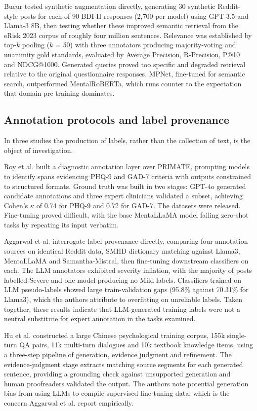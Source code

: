 \documentclass[11pt]{article}
\begin{document}
	Bucur\cite{bucur2024leveraging} tested synthetic augmentation directly, generating 30 synthetic Reddit-style posts for each of 90 BDI-II responses (2,700 per model) using GPT-3.5 and Llama-3 8B, then testing whether these improved semantic retrieval from the eRisk 2023 corpus of roughly four million sentences. Relevance was established by top-$k$ pooling ($k$ = 50) with three annotators producing majority-voting and unanimity gold standards, evaluated by Average Precision, R-Precision, P@10 and NDCG@1000. Generated queries proved too specific and degraded retrieval relative to the original questionnaire responses. MPNet, fine-tuned for semantic search, outperformed MentalRoBERTa, which runs counter to the expectation that domain pre-training dominates.
	
	\subsection{Annotation protocols and label provenance}
	
	In three studies the production of labels, rather than the collection of text, is the object of investigation.
	
	Roy et al.\cite{10.1145/3805697} built a diagnostic annotation layer over PRIMATE, prompting models to identify spans evidencing PHQ-9 and GAD-7 criteria with outputs constrained to structured formats. Ground truth was built in two stages: GPT-4o generated candidate annotations and three expert clinicians validated a subset, achieving Cohen's $\kappa$ of 0.74 for PHQ-9 and 0.72 for GAD-7. The datasets were released. Fine-tuning proved difficult, with the base MentaLLaMA model failing zero-shot tasks by repeating its input verbatim.
	
	Aggarwal et al.\cite{10973522} interrogate label provenance directly, comparing four annotation sources on identical Reddit data, SMHD dictionary matching against Llama3, MentaLLaMA and Samantha-Mistral, then fine-tuning downstream classifiers on each. The LLM annotators exhibited severity inflation, with the majority of posts labelled Severe and one model producing no Mild labels. Classifiers trained on LLM pseudo-labels showed large train-validation gaps (95.8\% against 70.31\% for Llama3), which the authors attribute to overfitting on unreliable labels. Taken together, these results indicate that LLM-generated training labels were not a neutral substitute for expert annotation in the tasks examined.
	
	Hu et al.\cite{hu2024psycollmenhancingllmpsychological} constructed a large Chinese psychological training corpus, 155k single-turn QA pairs, 11k multi-turn dialogues and 10k textbook knowledge items, using a three-step pipeline of generation, evidence judgment and refinement. The evidence-judgment stage extracts matching source segments for each generated sentence, providing a grounding check against unsupported generation and human proofreaders validated the output. The authors note potential generation bias from using LLMs to compile supervised fine-tuning data, which is the concern Aggarwal et al. report empirically.
	
\end{document}

